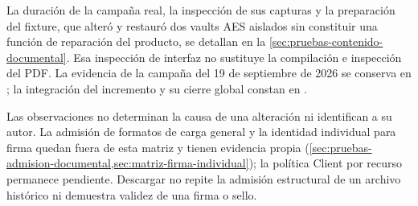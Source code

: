 La duración de la campaña real, la inspección de sus capturas y la preparación del fixture, que alteró y restauró dos vaults AES aislados sin constituir una función de reparación del producto, se detallan en la \cref{sec:pruebas-contenido-documental}. Esa inspección de interfaz no sustituye la compilación e inspección del PDF. La evidencia de la campaña del 19 de septiembre de 2026 se conserva en ; la integración del incremento y su cierre global constan en .

Las observaciones no determinan la causa de una alteración ni identifican a su autor. La admisión de formatos de carga general y la identidad individual para firma quedan fuera de esta matriz y tienen evidencia propia (\cref{sec:pruebas-admision-documental,sec:matriz-firma-individual}); la política Client por recurso permanece pendiente. Descargar no repite la admisión estructural de un archivo histórico ni demuestra validez de una firma o sello.
